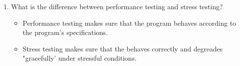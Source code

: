 \documentclass[11pt]{article}
\begin{document}
\begin{enumerate}
        \item What is the difference between performance testing and stress testing? 
       \begin{itemize}
           \item Performance testing makes sure that the program behaves according to the program's specifications. 
           \item Stress testing makes sure that the behaves correctly and degreades "gracefully' under stressful conditions. 
       \end{itemize}
    \end{enumerate}
    
    
\end{document}
